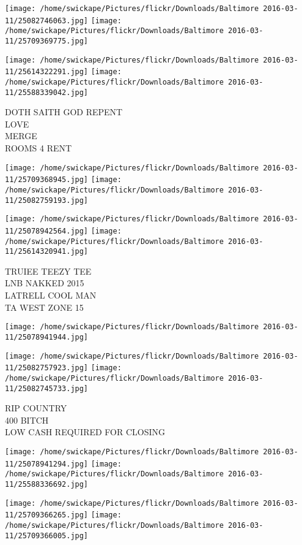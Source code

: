 \documentclass[10pt,letterpaper]{article}
\begin{document}
\texttt{[image: /home/swickape/Pictures/flickr/Downloads/Baltimore 2016-03-11/25082746063.jpg]}
\texttt{[image: /home/swickape/Pictures/flickr/Downloads/Baltimore 2016-03-11/25709369775.jpg]}

\texttt{[image: /home/swickape/Pictures/flickr/Downloads/Baltimore 2016-03-11/25614322291.jpg]}
\texttt{[image: /home/swickape/Pictures/flickr/Downloads/Baltimore 2016-03-11/25588339042.jpg]}

DOTH SAITH GOD REPENT\\
LOVE\\
MERGE\\
ROOMS 4 RENT\\
\pagebreak

\texttt{[image: /home/swickape/Pictures/flickr/Downloads/Baltimore 2016-03-11/25709368945.jpg]}
\texttt{[image: /home/swickape/Pictures/flickr/Downloads/Baltimore 2016-03-11/25082759193.jpg]}

\texttt{[image: /home/swickape/Pictures/flickr/Downloads/Baltimore 2016-03-11/25078942564.jpg]}
\texttt{[image: /home/swickape/Pictures/flickr/Downloads/Baltimore 2016-03-11/25614320941.jpg]}

TRUIEE TEEZY TEE\\
LNB NAKKED 2015\\
LATRELL COOL MAN\\
TA WEST ZONE 15\\
\pagebreak

\texttt{[image: /home/swickape/Pictures/flickr/Downloads/Baltimore 2016-03-11/25078941944.jpg]}

\vspace{0.25in}
\texttt{[image: /home/swickape/Pictures/flickr/Downloads/Baltimore 2016-03-11/25082757923.jpg]}
\texttt{[image: /home/swickape/Pictures/flickr/Downloads/Baltimore 2016-03-11/25082745733.jpg]}

RIP COUNTRY\\
400 BITCH\\
LOW CASH REQUIRED FOR CLOSING\\
\pagebreak

\texttt{[image: /home/swickape/Pictures/flickr/Downloads/Baltimore 2016-03-11/25078941294.jpg]}
\texttt{[image: /home/swickape/Pictures/flickr/Downloads/Baltimore 2016-03-11/25588336692.jpg]}

\texttt{[image: /home/swickape/Pictures/flickr/Downloads/Baltimore 2016-03-11/25709366265.jpg]}
\texttt{[image: /home/swickape/Pictures/flickr/Downloads/Baltimore 2016-03-11/25709366005.jpg]}
\end{document}
